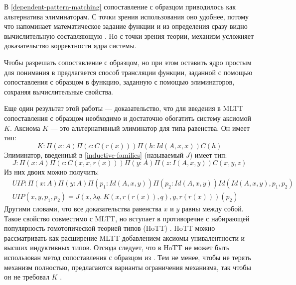 В \ref{dependent-pattern-matching} сопоставление с образцом приводилось как
альтернатива элиминаторам. С точки зрения использования оно удобнее, потому
что напоминает математическое задание функции и из определения сразу видно
вычислительную составляющую \cite{dependent-pattern-matching}.
Но с точки зрения теории, механизм усложняет доказательство корректности ядра
системы.

Чтобы разрешать сопоставление с образцом, но при этом оставить ядро простым для
понимания в \cite{eliminating-dependent-pattern-matching} предлагается способ
трансляции функции, заданной с помощью сопоставления с образцом в функцию,
заданную с помощью элиминаторов, сохраняя вычислительные свойства.

Еще один результат этой работы --- доказательство, что для введения в MLTT
сопоставления с образцом необходимо и достаточно обогатить систему аксиомой
\(K\). Аксиома \(K\) --- это альтернативный элиминатор для типа равенства.
Он имеет тип:
\[
K : \Pi(x : A) \Pi(c : C(r(x))) \Pi(h : Id(A, x, x)) C(h)
\]
Элиминатор, введенный в \ref{inductive-families} (называемый \(J\)) имеет тип:
\[
J : \Pi(x : A) \Pi(c : C(x, x, r(x))) \Pi(y : A) \Pi(z : I(A, x, y)) C(x, y, z)
\]
Из них двоих можно получить:
\begin{align*}
&UIP : \Pi(x : A) \Pi(y : A) \Pi(p_1 : Id(A, x, y)) \Pi(p_2 : Id(A, x, y)) Id(Id(A, x, y), p_1, p_2)\\
&UIP(x, y, p_1, p_2) = J(x, \lambda q.\ K(x, r(r(x)), q), y, r(r(x)))(p_2)
\end{align*}
Другими словами, что все доказательства равенства \(x\) и \(y\) равны между собой.
Такое свойство совместимо с MLTT, но вступает в противоречие с набирающей популярность
гомотопической теорией типов (HoTT) \cite{homotopy-type-theory}. HoTT можно
рассматривать как расширение MLTT добавлением аксиомы унивалентности и высших
индуктивных типов. Отсюда следует, что в HoTT не может быть использован метод
сопоставления с образцом из \cite{dependent-pattern-matching}. Тем не менее,
чтобы не терять механизм полностью, предлагаются варианты ограничения механизма,
так чтобы он не требовал \(K\) \cite{pattern-matching-without-K}.
